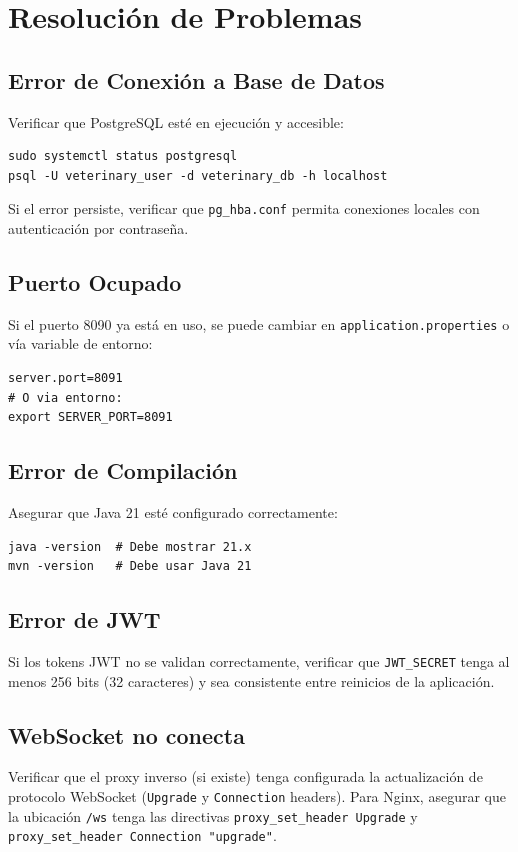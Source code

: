 \section{Resoluci\'on de Problemas}

\subsection{Error de Conexi\'on a Base de Datos}

Verificar que PostgreSQL est\'e en ejecuci\'on y accesible:

\begin{lstlisting}[caption=Verificar conexi\'on PostgreSQL]
sudo systemctl status postgresql
psql -U veterinary_user -d veterinary_db -h localhost
\end{lstlisting}

Si el error persiste, verificar que \texttt{pg\_hba.conf} permita conexiones locales con autenticaci\'on por contrase\~na.

\subsection{Puerto Ocupado}

Si el puerto 8090 ya est\'a en uso, se puede cambiar en \texttt{application.properties} o v\'ia variable de entorno:

\begin{lstlisting}
server.port=8091
# O via entorno:
export SERVER_PORT=8091
\end{lstlisting}

\subsection{Error de Compilaci\'on}

Asegurar que Java 21 est\'e configurado correctamente:

\begin{lstlisting}
java -version  # Debe mostrar 21.x
mvn -version   # Debe usar Java 21
\end{lstlisting}

\subsection{Error de JWT}

Si los tokens JWT no se validan correctamente, verificar que \texttt{JWT\_SECRET} tenga al menos 256 bits (32 caracteres) y sea consistente entre reinicios de la aplicaci\'on.

\subsection{WebSocket no conecta}

Verificar que el proxy inverso (si existe) tenga configurada la actualizaci\'on de protocolo WebSocket (\texttt{Upgrade} y \texttt{Connection} headers). Para Nginx, asegurar que la ubicaci\'on \texttt{/ws} tenga las directivas \texttt{proxy\_set\_header Upgrade} y \texttt{proxy\_set\_header Connection "upgrade"}.

